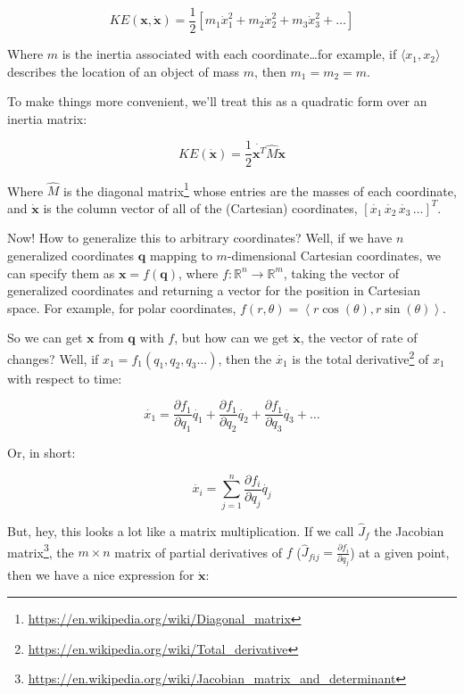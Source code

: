 \documentclass[]{article}
\renewcommand{\href}[2]{#2\footnote{\url{#1}}}
\begin{document}
\[
KE(\mathbf{x}, \dot{\mathbf{x}}) = \frac{1}{2} \left[ m_1 \dot{x}_1^2 + m_2 \dot{x}_2^2 + m_3 \dot{x}_3^2 + \dots \right]
\]

Where \(m\) is the inertia associated with each coordinate\ldots{}for example,
if \(\langle x_1, x_2 \rangle\) describes the location of an object of mass
\(m\), then \(m_1 = m_2 = m\).

To make things more convenient, we'll treat this as a quadratic form over an
inertia matrix:

\[
KE(\dot{\mathbf{x}}) = \frac{1}{2} \dot{\mathbf{x}^T} \hat{M} \dot{\mathbf{x}}
\]

Where \(\hat{M}\) is the
\href{https://en.wikipedia.org/wiki/Diagonal_matrix}{diagonal matrix} whose
entries are the masses of each coordinate, and \(\dot{\mathbf{x}}\) is the
column vector of all of the (Cartesian) coordinates,
\(\left[ \dot{x_1}\, \dot{x_2}\, \dot{x_3}\, \dots \right]^T\).

Now! How to generalize this to arbitrary coordinates? Well, if we have \(n\)
generalized coordinates \(\mathbf{q}\) mapping to \(m\)-dimensional Cartesian
coordinates, we can specify them as \(\mathbf{x} = f(\mathbf{q})\), where
\(f : \mathbb{R}^n \rightarrow \mathbb{R}^m\), taking the vector of generalized
coordinates and returning a vector for the position in Cartesian space. For
example, for polar coordinates,
\(f(r, \theta) = \left \langle r \cos(\theta), r \sin(\theta) \right \rangle\).

So we can get \(\mathbf{x}\) from \(\mathbf{q}\) with \(f\), but how can we get
\(\dot{\mathbf{x}}\), the vector of rate of changes? Well, if
\(x_1 = f_1(q_1, q_2, q_3 \dots)\), then the \(\dot{x_1}\) is the
\href{https://en.wikipedia.org/wiki/Total_derivative}{total derivative} of
\(x_1\) with respect to time:

\[
\dot{x_1} = \frac{\partial f_1}{\partial q_1} \dot{q_1} +
    \frac{\partial f_1}{\partial q_2} \dot{q_2} +
    \frac{\partial f_1}{\partial q_3} \dot{q_3} + \dots
\]

Or, in short:

\[
\dot{x_i} = \sum_{j = 1}^n \frac{\partial f_i}{\partial q_j} \dot{q_j}
\]

But, hey, this looks a lot like a matrix multiplication. If we call
\(\hat{J}_f\) the
\href{https://en.wikipedia.org/wiki/Jacobian_matrix_and_determinant}{Jacobian
matrix}, the \(m \times n\) matrix of partial derivatives of \(f\)
(\(\hat{J}_{fij} = \frac{\partial f_i}{\partial q_j}\)) at a given point, then
we have a nice expression for \(\dot{\mathbf{x}}\):
\end{document}
